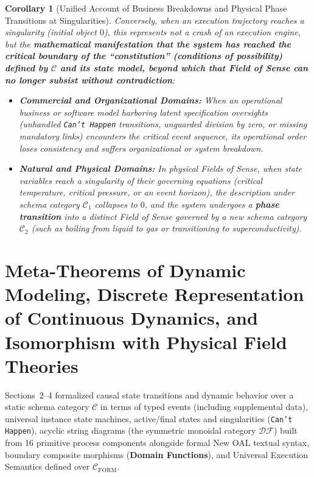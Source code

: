 \documentclass[11pt,a4paper]{article}
\theoremstyle{definition}
\theoremstyle{plain}
\newtheorem{corollary}{Corollary}[section]
\theoremstyle{remark}
\newcommand{\DF}{\mathcal{DF}}
\newcommand{\Cform}{\mathcal{C}_{\mathrm{FORM}}}
\begin{document}
\begin{corollary}[Unified Account of Business Breakdowns and Physical Phase Transitions at Singularities]\label{cor:singularities}
Conversely, when an execution trajectory reaches a singularity (initial object $0$), this represents not a crash of an execution engine, but the \textbf{mathematical manifestation that the system has reached the critical boundary of the ``constitution'' (conditions of possibility) defined by $\mathcal{C}$ and its state model, beyond which that Field of Sense can no longer subsist without contradiction}:
\begin{itemize}
    \item \textbf{Commercial and Organizational Domains:} When an operational business or software model harboring latent specification oversights (unhandled \texttt{Can't Happen} transitions, unguarded division by zero, or missing mandatory links) encounters the critical event sequence, its operational order loses consistency and suffers organizational or system breakdown.
    \item \textbf{Natural and Physical Domains:} In physical Fields of Sense, when state variables reach a singularity of their governing equations (critical temperature, critical pressure, or an event horizon), the description under schema category $\mathcal{C}_1$ collapses to $0$, and the system undergoes a \textbf{phase transition} into a distinct Field of Sense governed by a new schema category $\mathcal{C}_2$ (such as boiling from liquid to gas or transitioning to superconductivity).
\end{itemize}
\end{corollary}

\section{Meta-Theorems of Dynamic Modeling, Discrete Representation of Continuous Dynamics, and Isomorphism with Physical Field Theories}

Sections~2--4 formalized causal state transitions and dynamic behavior over a static schema category $\mathcal{C}$ in terms of typed events (including supplemental data), universal instance state machines, active/final states and singularities (\texttt{Can't Happen}), acyclic string diagrams (the symmetric monoidal category $\DF$) built from 16 primitive process components alongside formal New OAL textual syntax, boundary composite morphisms (\textbf{Domain Functions}), and Universal Execution Semantics defined over $\Cform$.
\end{document}
